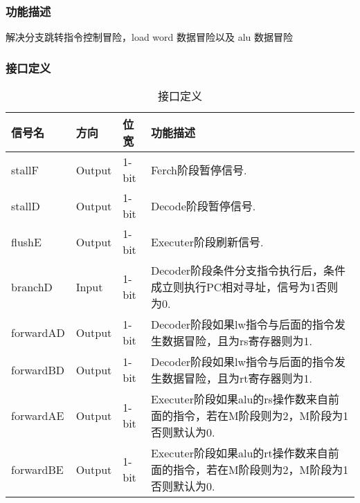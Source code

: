 \subsubsection{功能描述}
解决分支跳转指令控制冒险，load word 数据冒险以及 alu 数据冒险
\subsubsection{接口定义}

\begin{table}[htp]
\caption{接口定义}\label{tab:signaldef}
\begin{center}
	\begin{tabular}{lllp{9cm}}
		\hline
		\textbf{信号名} & \textbf{方向} & \textbf{位宽} & \textbf{功能描述}\\  \hline
		stallF   		& Output& 1-bit  & Ferch阶段暂停信号.\\  
		stallD   		& Output& 1-bit  & Decode阶段暂停信号.\\  
		flushE   		& Output& 1-bit  & Executer阶段刷新信号.\\  
		branchD			& Input & 1-bit  & Decoder阶段条件分支指令执行后，条件成立则执行PC相对寻址，信号为1否则为0.\\  
		forwardAD		& Output& 1-bit  & Decoder阶段如果lw指令与后面的指令发生数据冒险，且为rs寄存器则为1.\\  
		forwardBD		& Output& 1-bit  & Decoder阶段如果lw指令与后面的指令发生数据冒险，且为rt寄存器则为1.\\  
		forwardAE		& Output& 1-bit  & Executer阶段如果alu的rs操作数来自前面的指令，若在M阶段则为2，M阶段为1否则默认为0.\\  
		forwardBE		& Output& 1-bit  & Executer阶段如果alu的rt操作数来自前面的指令，若在M阶段则为2，M阶段为1否则默认为0.\\ 
		\hline
	\end{tabular}
\end{center}
\end{table}
